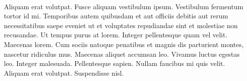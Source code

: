 \documentclass{article}
\begin{document}
	\newpage
	\paragraph{} Aliquam erat volutpat. Fusce aliquam vestibulum ipsum. Vestibulum fermentum tortor id mi. Temporibus autem quibusdam et aut officiis debitis aut rerum necessitatibus saepe eveniet ut et voluptates repudiandae sint et molestiae non recusandae. Ut tempus purus at lorem. Integer pellentesque quam vel velit. Maecenas lorem. Cum sociis natoque penatibus et magnis dis parturient montes, nascetur ridiculus mus. Maecenas aliquet accumsan leo. Vivamus luctus egestas leo. Integer malesuada. Pellentesque sapien. Nullam faucibus mi quis velit. Aliquam erat volutpat. Suspendisse nisl.
\end{document}
